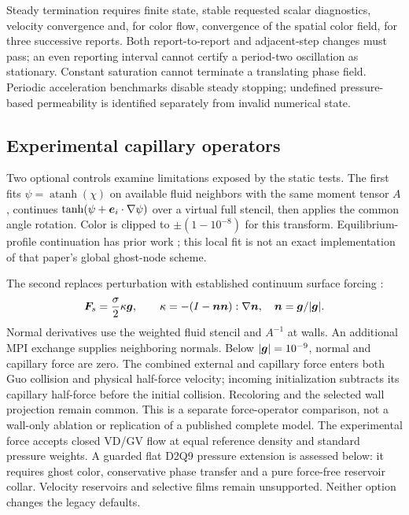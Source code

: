 Steady termination requires finite state, stable requested scalar diagnostics,
velocity convergence and, for color flow, convergence of the spatial color
field, for three successive reports. Both report-to-report and adjacent-step
changes must pass; an even reporting interval cannot certify a period-two
oscillation as stationary. Constant saturation cannot terminate a
translating phase field. Periodic acceleration benchmarks disable steady
stopping; undefined pressure-based permeability is identified separately
from invalid numerical state.

\subsection{Experimental capillary operators}
Two optional controls examine limitations exposed by the static tests.
The first fits $\psi=\operatorname{atanh}(\chi)$ on available fluid neighbors
with the same moment tensor $A$, continues $\tanh(\psi+\bm{e}_i\cdot\nabla\psi)$
over a virtual full stencil, then applies the common angle rotation.
Color is clipped to $\pm(1-10^{-8})$ for this transform. Equilibrium-profile
continuation has prior work \cite{bhattacharya2026}; this local fit is not
an exact implementation of that paper's global ghost-node scheme.

The second replaces perturbation with established continuum surface forcing
\cite{lishchuk2003,sedahmed2024}:
\begin{equation}
 \bm{F}_s=\frac{\sigma}{2}\kappa\bm{g},\qquad
 \kappa=-(I-\bm{n}\bm{n}):\nabla\bm{n},\quad
 \bm{n}=\bm{g}/|\bm{g}|.
\end{equation}
Normal derivatives use the weighted fluid stencil and $A^{-1}$ at walls.
An additional MPI exchange supplies neighboring normals. Below
$|\bm{g}|=10^{-9}$, normal and capillary force are zero. The combined external
and capillary force enters both Guo collision and physical half-force
velocity; incoming initialization subtracts its capillary half-force before
the initial collision. Recoloring and the selected wall projection remain
common. This is a separate force-operator comparison, not a wall-only
ablation or replication of a published complete model.
The experimental force accepts closed VD/GV flow at equal reference
density and standard pressure weights. A guarded flat D2Q9 pressure
extension is assessed below: it requires ghost color, conservative phase
transfer and a pure force-free reservoir collar. Velocity reservoirs and
selective films remain unsupported. Neither option changes the legacy defaults.

